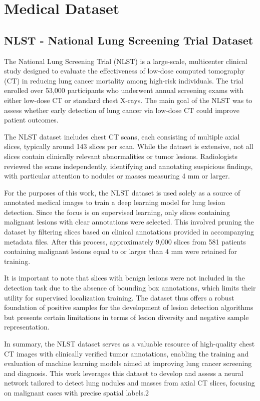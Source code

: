 \chapter{Medical Dataset}
\label{cap:medical_dataset}

\section{NLST - National Lung Screening Trial Dataset}
The National Lung Screening Trial (NLST) is a large-scale, multicenter clinical study designed to evaluate the effectiveness of low-dose computed tomography (CT) in reducing lung cancer mortality among high-risk individuals. The trial enrolled over 53,000 participants who underwent annual screening exams with either low-dose CT or standard chest X-rays. The main goal of the NLST was to assess whether early detection of lung cancer via low-dose CT could improve patient outcomes.

The NLST dataset includes chest CT scans, each consisting of multiple axial slices, typically around 143 slices per scan. While the dataset is extensive, not all slices contain clinically relevant abnormalities or tumor lesions. Radiologists reviewed the scans independently, identifying and annotating suspicious findings, with particular attention to nodules or masses measuring 4 mm or larger.

For the purposes of this work, the NLST dataset is used solely as a source of annotated medical images to train a deep learning model for lung lesion detection. Since the focus is on supervised learning, only slices containing malignant lesions with clear annotations were selected. This involved pruning the dataset by filtering slices based on clinical annotations provided in accompanying metadata files. After this process, approximately 9,000 slices from 581 patients containing malignant lesions equal to or larger than 4 mm were retained for training.

It is important to note that slices with benign lesions were not included in the detection task due to the absence of bounding box annotations, which limits their utility for supervised localization training. The dataset thus offers a robust foundation of positive samples for the development of lesion detection algorithms but presents certain limitations in terms of lesion diversity and negative sample representation.

In summary, the NLST dataset serves as a valuable resource of high-quality chest CT images with clinically verified tumor annotations, enabling the training and evaluation of machine learning models aimed at improving lung cancer screening and diagnosis. This work leverages this dataset to develop and assess a neural network tailored to detect lung nodules and masses from axial CT slices, focusing on malignant cases with precise spatial labels.2
